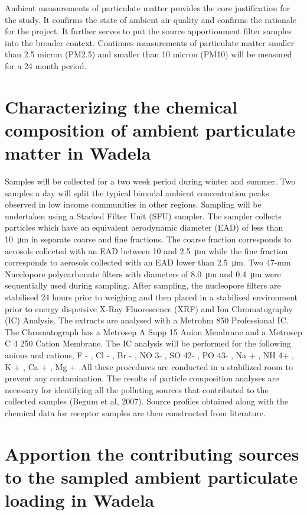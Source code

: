\documentclass{nwureport}
\begin{document}
Ambient measurements of particulate matter provides the core justification for the study. It confirms the state
of ambient air quality and confirms the rationale for the project. It further serves to put the source
apportionment filter samples into the broader context. Continues measurements of particulate matter smaller
than 2.5 micron (PM2.5) and smaller than 10 micron (PM10) will be measured for a 24 month period.

\section{Characterizing the chemical composition of ambient particulate matter in Wadela}

Samples will be collected for a two week period during winter and summer. Two samples a day will split the
typical bimodal ambient concentration peaks observed in low income communities in other regions. Sampling
will be undertaken using a Stacked Filter Unit (SFU) sampler. The sampler collects particles which have an
equivalent aerodynamic diameter (EAD) of less than \SI{10}{\micro\meter} in separate coarse and fine fractions. The
coarse fraction corresponds to aerosols collected with an EAD between \num{10} and \SI{2.5}{\micro\meter} while the fine fraction
corresponds to aerosols collected with an EAD lower than \SI{2.5}{\micro\meter}. Two 47-mm Nucelopore polycarbonate
filters with diameters of \SI{8.0}{\micro\meter} and \SI{0.4}{\micro\meter} were sequentially used during sampling.
After sampling, the nucleopore filters are stabilised 24 hours prior to weighing and then placed in a stabilised
environment prior to energy dispersive X-Ray Fluorescence (XRF) and Ion Chromatography (IC) Analysis.
The extracts are analysed with a Metrohm 850 Professional IC. The Chromatograph has a Metrosep A Supp
15 Anion Membrane and a Metrosep C 4 250 Cation Membrane. The IC analysis will be performed for the
following anions and cations, F - , Cl - , Br - , NO 3- , SO 42- , PO 43- , Na + , NH 4+ , K + , Ca + , Mg + .All these procedures are conducted in a stabilized room to prevent any contamination. The results of particle
composition analyses are necessary for identifying all the polluting sources that contributed to the collected
samples (Begum et al, 2007). Source profiles obtained along with the chemical data for receptor samples
are then constructed from literature.

\section{Apportion the contributing sources to the sampled ambient particulate loading in Wadela}
\end{document}
